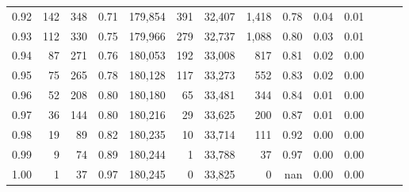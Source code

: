\begin{tabular}{rrrrrrrrrrrrrr}
0.92 &    142 &  348 &  0.71 &  179,854 &      391 &  32,407 &   1,418 &  0.78 &  0.04 &      0.01 \\
0.93 &    112 &  330 &  0.75 &  179,966 &      279 &  32,737 &   1,088 &  0.80 &  0.03 &      0.01 \\
0.94 &     87 &  271 &  0.76 &  180,053 &      192 &  33,008 &     817 &  0.81 &  0.02 &      0.00 \\
0.95 &     75 &  265 &  0.78 &  180,128 &      117 &  33,273 &     552 &  0.83 &  0.02 &      0.00 \\
0.96 &     52 &  208 &  0.80 &  180,180 &       65 &  33,481 &     344 &  0.84 &  0.01 &      0.00 \\
0.97 &     36 &  144 &  0.80 &  180,216 &       29 &  33,625 &     200 &  0.87 &  0.01 &      0.00 \\
0.98 &     19 &   89 &  0.82 &  180,235 &       10 &  33,714 &     111 &  0.92 &  0.00 &      0.00 \\
0.99 &      9 &   74 &  0.89 &  180,244 &        1 &  33,788 &      37 &  0.97 &  0.00 &      0.00 \\
1.00 &      1 &   37 &  0.97 &  180,245 &        0 &  33,825 &       0 &   nan &  0.00 &      0.00 \\
\bottomrule
\end{tabular}

